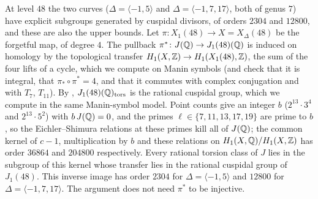 \begin{itemize}
 At level $48$ the two curves ($\Delta=\langle-1,5\rangle$ and $\Delta=\langle-1,7,17\rangle$, both of genus $7$)
 have explicit subgroups generated by cuspidal divisors, of orders $2304$ and $12800$, and these are also the upper
 bounds. Let $\pi\colon X_1(48)\to X=X_\Delta(48)$ be the forgetful map, of degree $4$. The pullback
 $\pi^*\colon J(\mathbb{Q})\to J_1(48)(\mathbb{Q})$ is induced on homology by the topological transfer
 $H_1(X,\mathbb{Z})\to H_1(X_1(48),\mathbb{Z})$, the sum of the four lifts of a cycle, which we compute on Manin symbols (and check
 that it is integral, that $\pi_*\circ\pi^*=4$, and that it commutes with complex conjugation and with $T_7$,
 $T_{11}$). By \cite[Theorem~4.13]{DEH2021}, $J_1(48)(\mathbb{Q})_{\mathrm{tors}}$ is the rational cuspidal group, which we
 compute in the same Manin-symbol model. Point counts give an integer $b$ ($2^{13}\cdot3^4$ and $2^{13}\cdot5^2$)
 with $b\,J(\mathbb{Q})=0$, and the primes $\ell\in\{7,11,13,17,19\}$ are prime to $b$, so the Eichler--Shimura relations at
 these primes kill all of $J(\mathbb{Q})$; the common kernel of $c-1$, multiplication by $b$ and these relations on
 $H_1(X,\mathbb{Q})/H_1(X,\mathbb{Z})$ has order $36864$ and $204800$ respectively. Every rational torsion class of $J$ lies in the
 subgroup of this kernel whose transfer lies in the rational cuspidal group of $J_1(48)$. This inverse image has order $2304$ for $\Delta=\langle-1,5\rangle$ and $12800$ for
 $\Delta=\langle-1,7,17\rangle$. The argument does not need $\pi^*$ to be injective.
\end{itemize}

